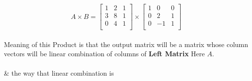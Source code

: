 \documentclass[a4paper,11pt]{article}
\numberwithin{equation}{section}
\begin{document}
\begin{itemize}
\begin{itemize}
                \begin{equation}
                    A \times B=
                    \begin{bmatrix}
                        1 & 2 & 1 \\
                        3 & 8 & 1 \\
                        0 & 4 & 1 \\
                    \end{bmatrix} \times
                    \begin{bmatrix}
                        1 & 0 & 0 \\
                        0 & 2 & 1 \\
                        0 & -1 & 1 \\
                    \end{bmatrix}
                \end{equation}\\
                    
                Meaning of this Product is that the output matrix will be a matrix whose column vectors will be linear combination of columns of \textbf{Left Matrix} Here $A$.\\
                \hspace{5cm} \\
                \& the way that linear combination is\\


\end{itemize}
\end{itemize}
\end{document}
